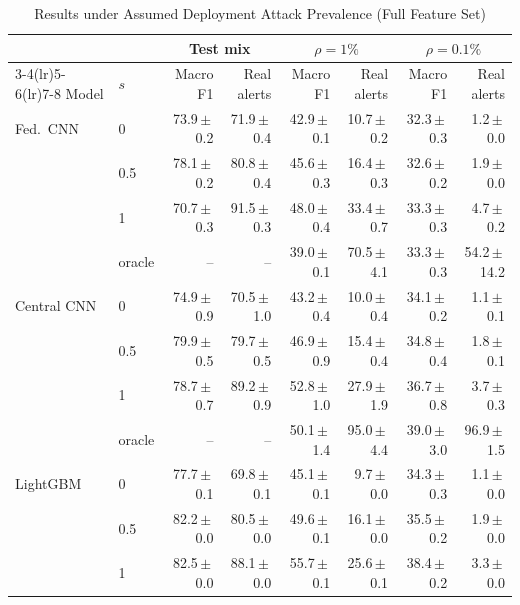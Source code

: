 \begin{table}[t]
\centering
\scriptsize
\caption{Results under Assumed Deployment Attack Prevalence (Full Feature Set)}
\label{tab:prevalence}
\setlength{\tabcolsep}{3pt}
\begin{tabular}{llrrrrrr}
\toprule
& & \multicolumn{2}{c}{Test mix} & \multicolumn{2}{c}{$\rho=1\%$} & \multicolumn{2}{c}{$\rho=0.1\%$} \\
\cmidrule(lr){3-4}\cmidrule(lr){5-6}\cmidrule(lr){7-8}
Model & $s$ & Macro F1 & Real alerts & Macro F1 & Real alerts & Macro F1 & Real alerts \\
\midrule
Fed.\ CNN & 0 & 73.9{\,}$\pm${\,}0.2 & 71.9{\,}$\pm${\,}0.4 & 42.9{\,}$\pm${\,}0.1 & 10.7{\,}$\pm${\,}0.2 & 32.3{\,}$\pm${\,}0.3 & 1.2{\,}$\pm${\,}0.0 \\
 & 0.5 & 78.1{\,}$\pm${\,}0.2 & 80.8{\,}$\pm${\,}0.4 & 45.6{\,}$\pm${\,}0.3 & 16.4{\,}$\pm${\,}0.3 & 32.6{\,}$\pm${\,}0.2 & 1.9{\,}$\pm${\,}0.0 \\
 & 1 & 70.7{\,}$\pm${\,}0.3 & 91.5{\,}$\pm${\,}0.3 & 48.0{\,}$\pm${\,}0.4 & 33.4{\,}$\pm${\,}0.7 & 33.3{\,}$\pm${\,}0.3 & 4.7{\,}$\pm${\,}0.2 \\
 & oracle & -- & -- & 39.0{\,}$\pm${\,}0.1 & 70.5{\,}$\pm${\,}4.1 & 33.3{\,}$\pm${\,}0.3 & 54.2{\,}$\pm${\,}14.2 \\
\midrule
Central CNN & 0 & 74.9{\,}$\pm${\,}0.9 & 70.5{\,}$\pm${\,}1.0 & 43.2{\,}$\pm${\,}0.4 & 10.0{\,}$\pm${\,}0.4 & 34.1{\,}$\pm${\,}0.2 & 1.1{\,}$\pm${\,}0.1 \\
 & 0.5 & 79.9{\,}$\pm${\,}0.5 & 79.7{\,}$\pm${\,}0.5 & 46.9{\,}$\pm${\,}0.9 & 15.4{\,}$\pm${\,}0.4 & 34.8{\,}$\pm${\,}0.4 & 1.8{\,}$\pm${\,}0.1 \\
 & 1 & 78.7{\,}$\pm${\,}0.7 & 89.2{\,}$\pm${\,}0.9 & 52.8{\,}$\pm${\,}1.0 & 27.9{\,}$\pm${\,}1.9 & 36.7{\,}$\pm${\,}0.8 & 3.7{\,}$\pm${\,}0.3 \\
 & oracle & -- & -- & 50.1{\,}$\pm${\,}1.4 & 95.0{\,}$\pm${\,}4.4 & 39.0{\,}$\pm${\,}3.0 & 96.9{\,}$\pm${\,}1.5 \\
\midrule
LightGBM & 0 & 77.7{\,}$\pm${\,}0.1 & 69.8{\,}$\pm${\,}0.1 & 45.1{\,}$\pm${\,}0.1 & 9.7{\,}$\pm${\,}0.0 & 34.3{\,}$\pm${\,}0.3 & 1.1{\,}$\pm${\,}0.0 \\
 & 0.5 & 82.2{\,}$\pm${\,}0.0 & 80.5{\,}$\pm${\,}0.0 & 49.6{\,}$\pm${\,}0.1 & 16.1{\,}$\pm${\,}0.0 & 35.5{\,}$\pm${\,}0.2 & 1.9{\,}$\pm${\,}0.0 \\
 & 1 & 82.5{\,}$\pm${\,}0.0 & 88.1{\,}$\pm${\,}0.0 & 55.7{\,}$\pm${\,}0.1 & 25.6{\,}$\pm${\,}0.1 & 38.4{\,}$\pm${\,}0.2 & 3.3{\,}$\pm${\,}0.0 \\

\end{tabular}
\end{table}
